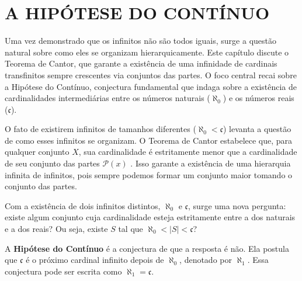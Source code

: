 
\chapter{A HIPÓTESE DO CONTÍNUO}
\label{chap:hipotese_continuo}

Uma vez demonstrado que os infinitos não são todos iguais, surge a questão natural sobre como eles se organizam hierarquicamente. Este capítulo discute o Teorema de Cantor, que garante a existência de uma infinidade de cardinais transfinitos sempre crescentes via conjuntos das partes. O foco central recai sobre a Hipótese do Contínuo, conjectura fundamental que indaga sobre a existência de cardinalidades intermediárias entre os números naturais (\(\aleph_0\)) e os números reais (\(\mathfrak{c}\)).

O fato de existirem infinitos de tamanhos diferentes (\(\aleph_0 < \mathfrak{c}\)) levanta a questão de como esses infinitos se organizam. O Teorema de Cantor estabelece que, para qualquer conjunto \(X\), sua cardinalidade é estritamente menor que a cardinalidade de seu conjunto das partes \(\mathcal{P}(x)\) \parencite[p.~139]{aigner2018}. Isso garante a existência de uma hierarquia infinita de infinitos, pois sempre podemos formar um conjunto maior tomando o conjunto das partes.

Com a existência de dois infinitos distintos, \(\aleph_0\) e \(\mathfrak{c}\), surge uma nova pergunta: existe algum conjunto cuja cardinalidade esteja estritamente entre a dos naturais e a dos reais? Ou seja, existe \(S\) tal que \(\aleph_0 < |S| < \mathfrak{c}\)?

A \textbf{Hipótese do Contínuo} é a conjectura de que a resposta é não. Ela postula que \(\mathfrak{c}\) é o próximo cardinal infinito depois de \(\aleph_0\), denotado por \(\aleph_1\). Essa conjectura pode ser escrita como \(\aleph_1 = \mathfrak{c}\).